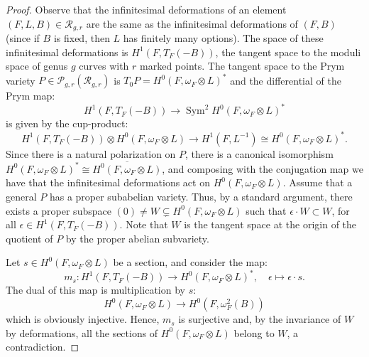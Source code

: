 \documentclass[10pt,a4paper]{amsart}
\def\cP{\ensuremath{\mathcal{P}}}
\def\cR{\ensuremath{\mathcal{R}}}
\begin{document}
\begin{proof}
Observe that the infinitesimal deformations of an element $(F,L,B)\in \cR_{g,r}$ are the same as the infinitesimal deformations of $(F,B)$ (since if $B$ is fixed, then $L$ has finitely many options).
The space of these infinitesimal deformations is $H^1(F,T_F(-B))$, the tangent space to the moduli space of genus $g$ curves with $r$ marked points.
The tangent space to the Prym variety $P\in \cP_{g,r}(\cR_{g,r})$ is $T_0P=H^0(F,\omega_F\otimes L)^*$ and the differential of the Prym map:
\[
H^1(F,T_F(-B)) \to \operatorname{Sym}^2 H^0(F,\omega_F\otimes L)^*
\]
is given by the cup-product:
\[
H^1(F,T_F(-B))\otimes H^0(F,\omega_F \otimes L)\to H^1(F,L^{-1})\cong H^0(F,\omega_F\otimes L)^*.
\]
Since there is a natural polarization on $P$, there is a canonical isomorphism $H^0(F,\omega_F\otimes L)^*\cong \overline{H^0( F,\omega_F\otimes L)}$, and composing with the conjugation map we have that the infinitesimal deformations act on $H^0(F,\omega_F \otimes L)$.
Assume that a general $P$ has a proper subabelian variety.
Thus, by a standard argument, there exists a proper subspace $(0)\neq W \subsetneq H^0(F,\omega_F \otimes L)$ such that $\epsilon \cdot W \subset W$, for all $\epsilon \in H^1(F,T_F (-B))$.
Note that $W$ is the tangent space at the origin of the quotient of $P$ by the proper abelian subvariety.

Let $s \in H^0(F,\omega_F \otimes L)$ be a section, and consider the map:
\[
m_{s}:H^1(F,T_F (-B)) \to H^0(F,\omega_F \otimes L)^*, \quad \epsilon \mapsto \epsilon \cdot s.
\]
The dual of this map is multiplication by $s$:
\[
H^0(F,\omega_F \otimes L) \to H^0(F,\omega_F ^2(B)) 
\]
which is obviously injective.
Hence, $m_{s}$ is surjective and, by the invariance of $W$ by deformations, all the sections of $H^0(F,\omega_F \otimes L)$ belong to $W$, a contradiction.
\end{proof}
\end{document}
